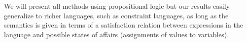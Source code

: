 We will present all methods using propositional logic but our results easily generalize to richer languages, such as constraint languages, as long as the semantics is given in terms of a satisfaction relation  between expressions in the language and possible states of affairs (assignments of values to variables).
 
%  
% 
% 

